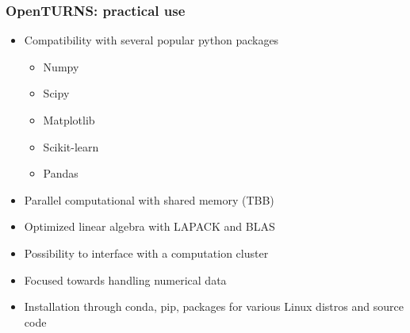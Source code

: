 \documentclass[aspectratio=169]{beamer}
\begin{document}
\begin{frame}[containsverbatim]
\end{frame}
  

\begin{frame}[containsverbatim]
  \frametitle{OpenTURNS: practical use}
  
  \small
  \begin{itemize}
  \item Compatibility with several popular python packages
  \begin{itemize}
  \scriptsize
  \item Numpy
  \item Scipy
  \item Matplotlib
  \item Scikit-learn
  \item Pandas
  \end{itemize}
  \vspace{10pt}
  \item Parallel computational with shared memory (TBB)
  \vspace{10pt}
  \item Optimized linear algebra with LAPACK and BLAS 
  \vspace{10pt}
  \item Possibility to interface with a computation cluster
  \vspace{10pt}
  \item Focused towards handling numerical data
  \vspace{10pt}
  \item Installation through conda, pip, packages for various Linux distros and source code
  \end{itemize}
\end{frame}
  


\end{document}
